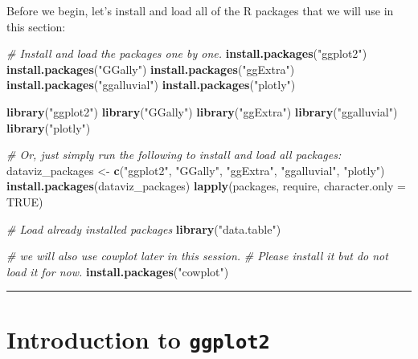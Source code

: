 \documentclass[]{book}
\newenvironment{Shaded}{\begin{snugshade}}{\end{snugshade}}
\newcommand{\CommentTok}[1]{\textcolor[rgb]{0.56,0.35,0.01}{\textit{#1}}}
\newcommand{\DataTypeTok}[1]{\textcolor[rgb]{0.13,0.29,0.53}{#1}}
\newcommand{\KeywordTok}[1]{\textcolor[rgb]{0.13,0.29,0.53}{\textbf{#1}}}
\newcommand{\NormalTok}[1]{#1}
\newcommand{\OtherTok}[1]{\textcolor[rgb]{0.56,0.35,0.01}{#1}}
\newcommand{\StringTok}[1]{\textcolor[rgb]{0.31,0.60,0.02}{#1}}
\begin{document}
Before we begin, let's install and load all of the R packages that we will use in this section:

\begin{Shaded}
\begin{Highlighting}[]
\CommentTok{# Install and load the packages one by one.}
\KeywordTok{install.packages}\NormalTok{(}\StringTok{"ggplot2"}\NormalTok{)}
\KeywordTok{install.packages}\NormalTok{(}\StringTok{"GGally"}\NormalTok{)}
\KeywordTok{install.packages}\NormalTok{(}\StringTok{"ggExtra"}\NormalTok{)}
\KeywordTok{install.packages}\NormalTok{(}\StringTok{"ggalluvial"}\NormalTok{)}
\KeywordTok{install.packages}\NormalTok{(}\StringTok{"plotly"}\NormalTok{)}

\KeywordTok{library}\NormalTok{(}\StringTok{"ggplot2"}\NormalTok{)}
\KeywordTok{library}\NormalTok{(}\StringTok{"GGally"}\NormalTok{)}
\KeywordTok{library}\NormalTok{(}\StringTok{"ggExtra"}\NormalTok{)}
\KeywordTok{library}\NormalTok{(}\StringTok{"ggalluvial"}\NormalTok{)}
\KeywordTok{library}\NormalTok{(}\StringTok{"plotly"}\NormalTok{)}

\CommentTok{# Or, just simply run the following to install and load all packages:}
\NormalTok{dataviz_packages <-}\StringTok{ }\KeywordTok{c}\NormalTok{(}\StringTok{"ggplot2"}\NormalTok{, }\StringTok{"GGally"}\NormalTok{, }\StringTok{"ggExtra"}\NormalTok{, }\StringTok{"ggalluvial"}\NormalTok{, }\StringTok{"plotly"}\NormalTok{)}
\KeywordTok{install.packages}\NormalTok{(dataviz_packages)}
\KeywordTok{lapply}\NormalTok{(packages, require, }\DataTypeTok{character.only =} \OtherTok{TRUE}\NormalTok{)}

\CommentTok{# Load already installed packages}
\KeywordTok{library}\NormalTok{(}\StringTok{"data.table"}\NormalTok{)}

\CommentTok{# we will also use cowplot later in this session.}
\CommentTok{# Please install it but do not load it for now.}
\KeywordTok{install.packages}\NormalTok{(}\StringTok{"cowplot"}\NormalTok{)}
\end{Highlighting}
\end{Shaded}

\begin{center}\rule{0.5\linewidth}{\linethickness}\end{center}

\hypertarget{introduction-to-ggplot2}{%
\section{\texorpdfstring{Introduction to \texttt{ggplot2}}{Introduction to ggplot2}}\label{introduction-to-ggplot2}}
\end{document}
